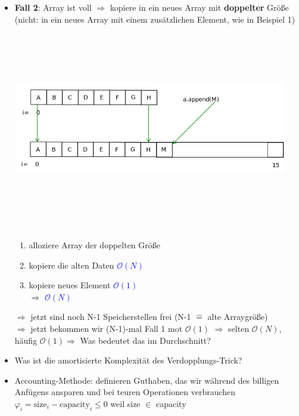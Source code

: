\documentclass[11pt, fleqn]{scrreprt}
\newcommand{\bigO}[0]{\mathcal{O}}
\begin{document}
\begin{itemize}
    \item \textbf{Fall 2}: Array ist voll $\Rightarrow$ kopiere in ein neues Array mit \textbf{doppelter} Größe \\
    (nicht: in ein neues Array mit einem zusätzlichen Element, wie in Beispiel 1) \\
    \includegraphics[width=12cm,height=9cm,keepaspectratio]{./Pictures/dynArrDopp.png}
    \begin{enumerate}
        \item alloziere Array der doppelten Größe
        \item kopiere die alten Daten \hspace*{3cm} \textcolor{blue}{$\bigO{}(N)$}
        \item kopiere neues Element  \hspace*{3.1cm} \textcolor{blue}{$\bigO{}(1)$} \\
        $\Rightarrow$ \textcolor{blue}{$\bigO{}(N)$}
    \end{enumerate}
    $\Rightarrow$ jetzt sind noch N-1 Speicherstellen frei (N-1 $\widehat{=}$ alte Arraygröße) \\
    $\Rightarrow$ jetzt bekommen wir (N-1)-mal Fall 1 mot $\bigO{}(1)$
    $\Rightarrow$ selten $\bigO{}(N)$, häufig $\bigO{}(1)$$\Rightarrow$ Was bedeutet das im Durchschnitt?

    \item Was ist die amortisierte Komplexität des \glqq Verdopplungs-Trick\grqq ?
    \item Accounting-Methode: definieren \glqq Guthaben\grqq, das wir während des billigen Anfügens ansparen und bei teuren Operationen verbrauchen \\
    $\varphi_i = \text{size}_i - \text{capacity}_i \leq 0$ weil size $\in$ capacity
\end{itemize}
\end{document}
